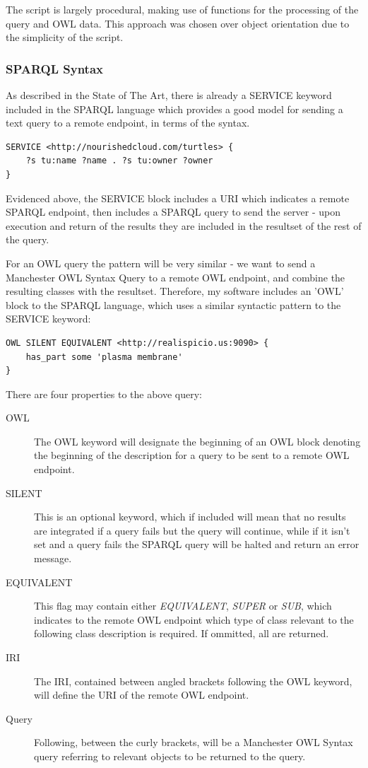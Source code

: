 \documentclass{article}
\begin{document}
The script is largely procedural, making use of functions for the processing of
the query and OWL data. This approach was chosen over object orientation due to
the simplicity of the script.

\subsubsection{SPARQL Syntax}

As described in the State of The Art, there is already a SERVICE keyword
included in the SPARQL language which provides a good model for sending a text
query to a remote endpoint, in terms of the syntax.\cite{sservice} 

\begin{lstlisting}
SERVICE <http://nourishedcloud.com/turtles> { 
    ?s tu:name ?name . ?s tu:owner ?owner
}
\end{lstlisting}

Evidenced above, the SERVICE block includes a URI which indicates a remote
SPARQL endpoint, then includes a SPARQL query to send the server - upon
execution and return of the results they are included in the resultset of the
rest of the query.

For an OWL query the pattern will be very similar - we want to send a Manchester
OWL Syntax Query to a remote OWL endpoint, and combine the resulting classes
with the resultset. Therefore, my software includes an 'OWL' block to the SPARQL 
language, which uses a similar syntactic pattern to the SERVICE keyword:

\begin{lstlisting}
OWL SILENT EQUIVALENT <http://realispicio.us:9090> {
    has_part some 'plasma membrane'
}
\end{lstlisting}

There are four properties to the above query:

\begin{description}
    \item[OWL] The OWL keyword will designate the beginning of an OWL block
    denoting the beginning of the description for a query to be sent to a remote
    OWL endpoint.
    \item[SILENT] This is an optional keyword, which if included will mean that
    no results are integrated if a query fails but the query will continue,
    while if it isn't set and a query fails the SPARQL query will be halted and
    return an error message.
    \item[EQUIVALENT] This flag may contain either \emph{EQUIVALENT},
    \emph{SUPER} or \emph{SUB}, which indicates to the remote OWL endpoint
    which type of class relevant to the following class description is required.
    If ommitted, all are returned.
    \item[IRI] The IRI, contained between angled brackets following the OWL
    keyword, will define the URI of the remote OWL endpoint.
    \item[Query] Following, between the curly brackets, will be a Manchester OWL
    Syntax query referring to relevant objects to be returned to the query.
\end{description}
\end{document}
